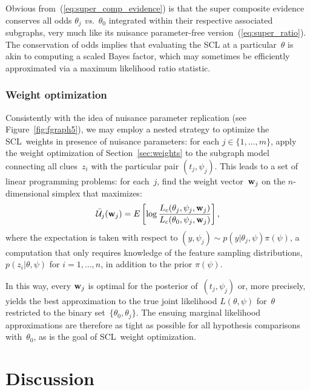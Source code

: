 \documentclass[english]{scrartcl}
\begin{document}
Obvious from~(\ref{eq:super_comp_evidence}) is that the super composite evidence conserves all odds $\theta_j$ {\em vs.}~$\theta_0$ integrated within their respective associated subgraphs, very much like its nuisance parameter-free version~(\ref{eq:super_ratio}). The conservation of odds implies  that evaluating the SCL at a particular~$\theta$ is akin to computing a scaled Bayes factor, which may sometimes be efficiently approximated via a maximum likelihood ratio statistic.


\subsubsection{Weight optimization}
\label{sec:nuisance_weights}

Consistently with the idea of nuisance parameter replication (see Figure~\ref{fig:fgraph5}), we may employ a nested strategy to optimize the SCL~weights in presence of nuisance parameters: for each $j\in\{1,\ldots,m\}$, apply the weight optimization of Section~\ref{sec:weights} to the  subgraph model connecting all clues~$z_i$ with the particular pair $(t_j,\psi_j)$. This leads to a set of linear programming problems: for each~$j$, find the weight vector~${\bf w}_j$ on the $n$-dimensional simplex that maximizes:
$$
\bar{\cal U}_j({\bf w}_j) 
= 
E\left[\log \frac{L_c(\theta_j,\psi_j,{\bf w}_j)}{L_c(\theta_0,\psi_j,{\bf w}_j)}\right],
$$
where the expectation is taken with respect to $(y,\psi_j)\sim p(y|\theta_j,\psi)\pi(\psi)$, a computation that only requires knowledge of the feature sampling distributions, $p(z_i|\theta,\psi)$ for $i=1,\ldots,n$, in addition to the prior $\pi(\psi)$.

In this way, every ${\bf w}_j$ is optimal for the posterior of~$(t_j,\psi_j)$ or, more precisely, yields the best approximation to the true joint likelihood $L(\theta, \psi)$ for~$\theta$ restricted to the binary set~$\{\theta_0,\theta_j\}$. The ensuing marginal likelihood approximations are therefore as tight as possible for all hypothesis comparisons with~$\theta_0$, as is the goal of SCL~weight optimization. 



\section{Discussion}
\label{sec:discussion}
\end{document}
